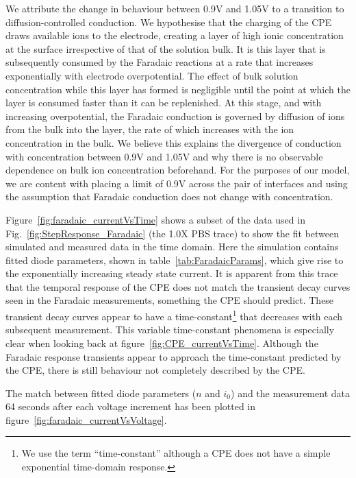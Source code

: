 \documentclass[journal, a4paper]{IEEEtran}
\begin{document}
We attribute the change in behaviour between 0.9\thinspace V and 1.05\thinspace V to a transition to diffusion-controlled conduction.
We hypothesise that the charging of the CPE draws available ions to the electrode, creating a layer of high ionic concentration at the surface irrespective of that of the solution bulk. It is this layer that is subsequently consumed by the Faradaic reactions at a {\color{blue} rate that increases exponentially with} electrode overpotential.  The effect of bulk solution concentration while this layer has formed is negligible until the point at which the layer is consumed faster than it can be replenished. At this stage, and with increasing overpotential, the Faradaic conduction is governed by diffusion of ions from the bulk into the layer, the rate of which increases with the ion concentration in the bulk. We believe this explains the divergence of conduction with concentration between 0.9\thinspace V and 1.05\thinspace V and why there is no observable dependence on bulk ion concentration beforehand.
For the purposes of our model, we are content with placing a limit of 0.9\thinspace V across the pair of interfaces and using the assumption that Faradaic conduction does not change with concentration.


    Figure~\ref{fig:faradaic_currentVsTime} shows a subset of the data used in Fig.~\ref{fig:StepResponse_Faradaic} (the 1.0X PBS trace) to show the fit between simulated and measured data in the time domain. Here the simulation contains fitted diode parameters, shown in table~\ref{tab:FaradaicParams}, which give rise to the exponentially increasing steady state current.
It is apparent from this trace that the temporal response of the CPE does not match the transient decay curves seen in the Faradaic measurements, something the CPE should predict. These transient decay curves appear to have a time-constant\footnote{We use the term ``time-constant'' although a CPE does not have a simple exponential time-domain response.} that decreases with each subsequent measurement. This variable time-constant phenomena is especially clear when looking back at figure~\ref{fig:CPE_currentVsTime}. Although the Faradaic response transients appear to approach the time-constant predicted by the CPE, there is still behaviour not completely described by the CPE.

The match between fitted diode parameters ($n$ and $i_{0}$) and the measurement data 64 seconds after each voltage increment has been plotted in figure~\ref{fig:faradaic_currentVsVoltage}.
\end{document}
